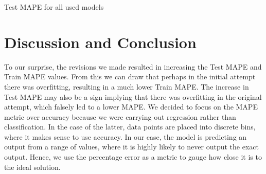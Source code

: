 \documentclass[journal, 12pt]{IEEEtran}
\begin{document}
\begingroup
    \centering
    \medskip
    \qquad
    \caption{Test MAPE for all used models}%
    \label{fig:curves}%
    \medskip
\endgroup

\section{Discussion and Conclusion}

\noindent To our surprise, the revisions we made resulted in increasing the Test MAPE and Train MAPE values. From this we can draw that perhaps in the initial attempt there was overfitting, resulting in a much lower Train MAPE. The increase in Test MAPE may also be a sign implying that there was overfitting in the original attempt, which falsely led to a lower MAPE. We decided to focus on the MAPE metric over accuracy because we were carrying out regression rather than classification. In the case of the latter, data points are placed into discrete bins, where it makes sense to use accuracy. In our case, the model is predicting an output from a range of values, where it is highly likely to never output the exact output. Hence, we use the percentage error as a metric to gauge how close it is to the ideal solution.\\
\end{document}
